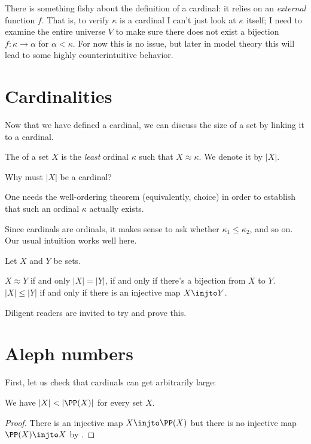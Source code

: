 \begin{remark}
	There is something fishy about the definition of a cardinal:
	it relies on an \emph{external} function $f$.
	That is, to verify $\kappa$ is a cardinal I can't just look at $\kappa$ itself;
	I need to examine the entire universe $V$ to make sure
	there does not exist a bijection $f : \kappa \to \alpha$ for $\alpha < \kappa$.
	For now this is no issue, but later in model theory
	this will lead to some highly counterintuitive behavior.
\end{remark}

\section{Cardinalities}
Now that we have defined a cardinal, we can discuss the size
of a set by linking it to a cardinal.

\begin{definition}
	The  of a set $X$
	is the \emph{least} ordinal $\kappa$ such that $X \approx \kappa$.
	We denote it by $\left\lvert X \right\rvert$.
\end{definition}
\begin{ques}
	Why must $\left\lvert X \right\rvert$ be a cardinal?
\end{ques}
\begin{remark}
	One needs the well-ordering theorem (equivalently, choice)
	in order to establish that such an ordinal $\kappa$ actually exists.
\end{remark}
Since cardinals are ordinals, it makes sense to ask whether $\kappa_1 \le \kappa_2$,
and so on.
Our usual intuition works well here.
\begin{proposition}
	Let $X$ and $Y$ be sets.
	\begin{enumerate}[(i)]
		\ii $X \approx Y$ if and only $\left\lvert X \right\rvert = \left\lvert Y \right\rvert$,
		if and only if there's a bijection from $X$ to $Y$.
		\ii $\left\lvert X \right\rvert \le \left\lvert Y \right\rvert$
		if and only if there is an injective map $X \injto Y$.
	\end{enumerate}
\end{proposition}
Diligent readers are invited to try and prove this.

\section{Aleph numbers}
First, let us check that cardinals can get arbitrarily large:
\begin{proposition}
	We have $\left\lvert X \right\rvert < \left\lvert \PP(X) \right\rvert$ for every set $X$.
\end{proposition}
\begin{proof}
	There is an injective map $X \injto \PP(X)$
	but there is no injective map $\PP(X) \injto X$ by .
\end{proof}

